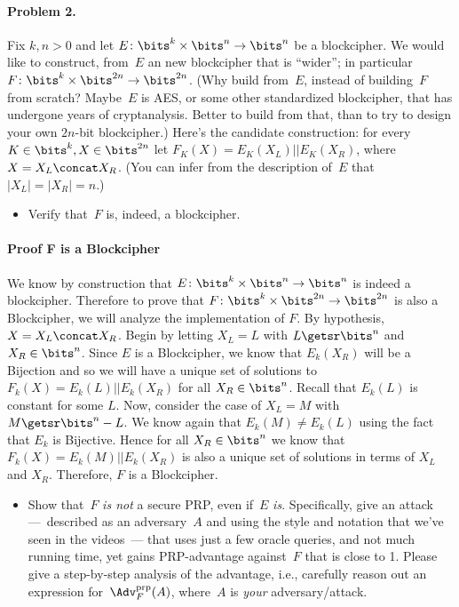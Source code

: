 \documentclass[11pt]{article}
\newcommand{\AdvPRP}[2]{\Adv^{\mathrm{prp}}_{#1}(#2)}
\begin{document}
\paragraph{Problem 2.}
Fix $k,n>0$ and let $E \colon \bits^k \times \bits^n \to \bits^n$ be a
blockcipher.  We would like to construct, from~$E$ an new blockcipher
that is ``wider''; in particular $F \colon \bits^k \times \bits^{2n}
\to \bits^{2n}$.  (Why build from~$E$, instead of building~$F$ from
scratch?  Maybe~$E$ is AES, or some other standardized blockcipher,
that has undergone years of cryptanalysis.  Better to build from that,
than to try to design your own $2n$-bit blockcipher.)  Here's the
candidate construction:  for every $K \in \bits^k, X \in \bits^{2n}$
let $F_K(X) = E_K(X_L) || E_K(X_R)$, where $X = X_L \concat X_R$.
(You can infer from the description of~$E$ that $|X_L|=|X_R|=n$.)

\begin{itemize}
\item Verify that~$F$ is, indeed, a blockcipher.
\end{itemize}

\paragraph{Proof F is a Blockcipher}
We know by construction that $E \colon \bits^k \times \bits^n \to \bits^n$ is indeed a blockcipher. Therefore to prove that $F \colon \bits^k \times \bits^{2n}
\to \bits^{2n}$ is also a Blockcipher, we will analyze the implementation of $F$. By hypothesis,  $X = X_L \concat X_R$. Begin by letting $X_L = L$ with $L \getsr \bits^n$ and $X_R \in \bits^n$. Since $E$ is a Blockcipher, we know that $E_k(X_R)$ will be a Bijection and so we will have a unique set of solutions to $F_k(X) = E_k({L}) || E_k(X_R)$ for all $X_R \in \bits^{n}$. Recall that $E_k({L})$ is constant for some $L$. Now, consider the case of $X_L = M$ with $M \getsr \bits^n - {L}$. We know again that $E_k(M) \neq E_k(L)$ using the fact that $E_k$ is Bijective. Hence for all $X_R \in \bits^n$ we know that $F_k(X) = E_k(M) || E_k(X_R)$ is also a unique set of solutions in terms of $X_L$ and $X_R$. Therefore, $F$ is  a Blockcipher.

\begin{itemize}
\item Show that~$F$ \emph{is not} a secure PRP, even if~$E$
  \emph{is}.  Specifically, give an attack ---~described as an
  adversary~$A$ and using the style and notation that we've seen in
  the videos~--- that uses just a few oracle queries, and not much
  running time, yet gains PRP-advantage against~$F$ that is close to
  1.  Please give a step-by-step analysis of the advantage, i.e.,
  carefully reason out an expression for~$\AdvPRP{F}{A}$, where~$A$ is
  \emph{your} adversary/attack. 
\end{itemize}
\end{document}
